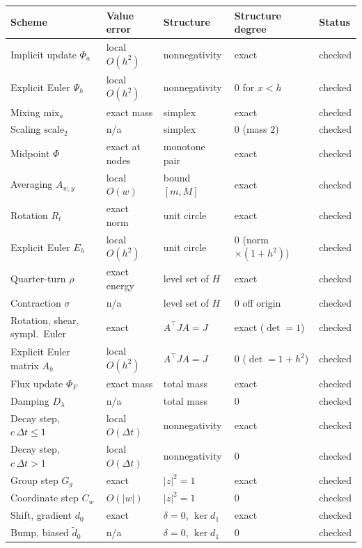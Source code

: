 \documentclass[11pt,a4paper]{article}
\begin{document}
\begin{table}[ht]
\centering
\small
\begin{tabular}{@{}lllll@{}}
\toprule
Scheme & Value error & Structure & Structure degree & Status \\
\midrule
Implicit update $\Phi_a$ & local $O(h^2)$ & nonnegativity & exact & checked \\
Explicit Euler $\Psi_h$ & local $O(h^2)$ & nonnegativity & $0$ for $x < h$ & checked \\
Mixing $\mathrm{mix}_a$ & exact mass & simplex & exact & checked \\
Scaling $\mathrm{scale}_2$ & n/a & simplex & $0$ (mass $2$) & checked \\
Midpoint $\Phi$ & exact at nodes & monotone pair & exact & checked \\
Averaging $A_{w,y}$ & local $O(w)$ & bound $[m,M]$ & exact & checked \\
Rotation $R_t$ & exact norm & unit circle & exact & checked \\
Explicit Euler $E_h$ & local $O(h^2)$ & unit circle & $0$ (norm ${\times}(1{+}h^2)$) & checked \\
Quarter-turn $\rho$ & exact energy & level set of $H$ & exact & checked \\
Contraction $\sigma$ & n/a & level set of $H$ & $0$ off origin & checked \\
Rotation, shear, sympl.\ Euler & exact & $A^{\top}JA = J$ & exact ($\det = 1$) & checked \\
Explicit Euler matrix $A_h$ & local $O(h^2)$ & $A^{\top}JA = J$ & $0$ ($\det = 1{+}h^2$) & checked \\
Flux update $\Phi_F$ & exact mass & total mass & exact & checked \\
Damping $D_\lambda$ & n/a & total mass & $0$ & checked \\
Decay step, $c\,\Delta t \le 1$ & local $O(\Delta t)$ & nonnegativity & exact & checked \\
Decay step, $c\,\Delta t > 1$ & local $O(\Delta t)$ & nonnegativity & $0$ & checked \\
Group step $G_g$ & exact & $|z|^2 = 1$ & exact & checked \\
Coordinate step $C_w$ & $O(|w|)$ & $|z|^2 = 1$ & $0$ & checked \\
Shift, gradient $d_0$ & exact & $\delta = 0$, $\ker d_1$ & exact & checked \\
Bump, biased $\tilde d_0$ & n/a & $\delta = 0$, $\ker d_1$ & $0$ & checked \\

\end{tabular}
\end{table}
\end{document}
